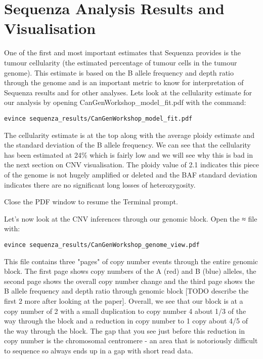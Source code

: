 
\newpage


\section{Sequenza Analysis Results and Visualisation}

One of the first and most important estimates that Sequenza provides is the tumour cellularity (the estimated percentage of tumour cells in the tumour genome). This estimate is based on the B allele frequency and depth ratio through the genome and is an important metric to know for interpretation of Sequenza results and for other analyses. Lets look at the cellularity estimate for our analysis by opening CanGenWorkshop\_model\_fit.pdf with the command:

\begin{steps}
\begin{lstlisting}
evince sequenza_results/CanGenWorkshop_model_fit.pdf
\end{lstlisting}
\end{steps}

The cellularity estimate is at the top along with the average ploidy estimate and the standard deviation of the B allele frequency. We can see that the cellularity has been estimated at 24\% which is fairly low and we will see why this is bad in the next section on CNV visualisation. The ploidy value of 2.1 indicates this piece of the genome is not hugely amplified or deleted and the BAF standard deviation indicates there are no significant long losses of heterozygosity.

Close the PDF window to resume the Terminal prompt.

Let's now look at the CNV inferences through our genomic block. Open the ≈ file with:

\begin{steps}
\begin{lstlisting}
evince sequenza_results/CanGenWorkshop_genome_view.pdf
\end{lstlisting}
\end{steps}

This file contains three "pages" of copy number events through the entire genomic block. The first page shows copy numbers of the A (red) and B (blue) alleles, the second page shows the overall copy number change and the third page shows the B allele frequency and depth ratio through genomic block [TODO describe the first 2 more after looking at the paper]. Overall, we see that our block is at a copy number of 2 with a small duplication to copy number 4 about 1/3 of the way through the block and a reduction in copy number to 1 copy about 4/5 of the way through the block. The gap that you see just before this reduction in copy number is the chromosomal centromere - an area that is notoriously difficult to sequence so always ends up in a gap with short read data.

